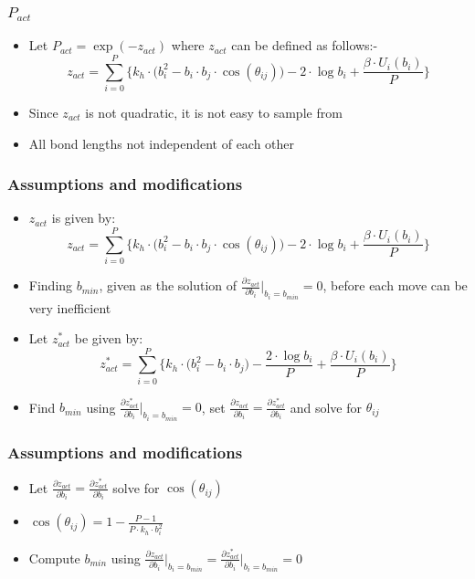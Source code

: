 \documentclass[xcolor=svgnames]{beamer}
\begin{document}
	\begin{frame}
	\frametitle{$P_{act}$}
	\begin{itemize}
	\item Let $P_{act} = \exp (-z_{act})$ where $z_{act}$ can be defined as follows:-
	\begin{equation*} \label {zact}
	z_{act} = \displaystyle\sum\limits_{i=0}^P \Bigg\{ k_h \cdot \Big( b_i^2 - b_i \cdot b_j \cdot \cos (\theta_{ij}) \Big) - 2 \cdot \log b_i + \frac{ \beta \cdot U_i (b_i)}{P} \Bigg\}
	\end{equation*}
	\item Since $z_{act}$ is not quadratic, it is not easy to sample from
	\item All bond lengths not independent of each other
	\end{itemize}
	\end{frame}

	\begin{frame}
	\frametitle{Assumptions and modifications}
	\begin{itemize}
	\justifying
	\item $z_{act}$ is given by:
	\begin{equation*}
	z_{act} = \displaystyle\sum\limits_{i=0}^P \Bigg\{ k_h \cdot \Big( b_i^2 - b_i \cdot b_j \cdot \cos (\theta_{ij}) \Big) - 2 \cdot \log b_i + \frac{ \beta \cdot U_i (b_i)}{P} \Bigg\}
	\end{equation*}
	\item Finding $b_{min}$, given as the solution of $\frac{\partial z_{act}}{\partial b_i} \Big|_{b_i = b_{min}} = 0$, before each move can be very inefficient
	\item Let $z_{act}^*$ be given by:
	\begin{equation*}
	z_{act}^* = \displaystyle\sum\limits_{i=0}^P \Bigg\{ k_h \cdot \Big( b_i^2 - b_i \cdot b_j \Big) - \frac{2 \cdot \log b_i}{P} + \frac{ \beta \cdot U_i (b_i)}{P} \Bigg\}
	\end{equation*}
	\item Find $b_{min}$ using $\frac{\partial z_{act}^*}{\partial b_i} \Big|_{b_i = b_{min}} = 0$, set $\displaystyle\frac{\partial z_{act}}{\partial b_i} = \displaystyle\frac{\partial z_{act}^*}{\partial b_i}$ and solve for $\theta_{ij}$
	\end{itemize}
	\end{frame}

	\begin{frame}
	\frametitle{Assumptions and modifications}
	\begin{itemize}
	\item Let $\frac{\partial z_{act}}{\partial b_i} = \frac{\partial z_{act}^*}{\partial b_i}$ solve for $\cos (\theta_{ij})$
	\item $\cos (\theta_{ij}) = 1 - \frac{P-1}{P \cdot k_h \cdot b_i^2}$
	\item Compute $b_{min}$ using $\frac{\partial z_{act}}{\partial b_i} \Bigg|_{b_i = b_{min}} = \frac{\partial z_{act}^*}{\partial b_i} \Bigg|_{b_i = b_{min}} = 0$
	\end{itemize}
	\end{frame}
\end{document}
